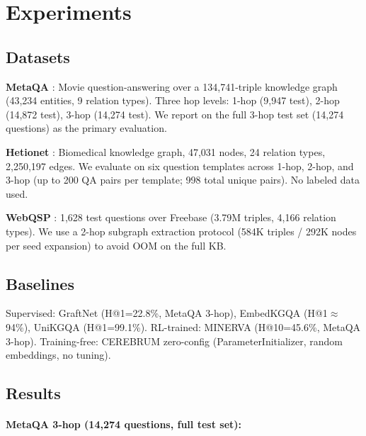 \documentclass[11pt,a4paper]{article}
\begin{document}
\section{Experiments}

\subsection{Datasets}

\textbf{MetaQA} \cite{metaqa2017}: Movie question-answering over a
134,741-triple knowledge graph (43,234 entities, 9 relation types). Three hop
levels: 1-hop (9,947 test), 2-hop (14,872 test), 3-hop (14,274 test). We report
on the full 3-hop test set (14,274 questions) as the primary evaluation.

\textbf{Hetionet} \cite{hetionet2017}: Biomedical knowledge graph,
47,031 nodes, 24 relation types, 2,250,197 edges. We evaluate on six question
templates across 1-hop, 2-hop, and 3-hop (up to 200 QA pairs per template; 998
total unique pairs). No labeled data used.

\textbf{WebQSP} \cite{webqsp2016}: 1,628 test questions over Freebase (3.79M
triples, 4,166 relation types). We use a 2-hop subgraph extraction protocol
(584K triples / 292K nodes per seed expansion) to avoid OOM on the full KB.

\subsection{Baselines}

Supervised: GraftNet \cite{sun2018graftnet} (H@1=22.8\%, MetaQA 3-hop),
EmbedKGQA \cite{saxena2020improve} (H@1$\approx$94\%),
UniKGQA \cite{jiang2023} (H@1=99.1\%).
RL-trained: MINERVA \cite{das2018minerva} (H@10=45.6\%, MetaQA 3-hop).
Training-free: CEREBRUM zero-config (ParameterInitializer, random embeddings,
no tuning).

\subsection{Results}

\paragraph{MetaQA 3-hop (14,274 questions, full test set):}
\end{document}
